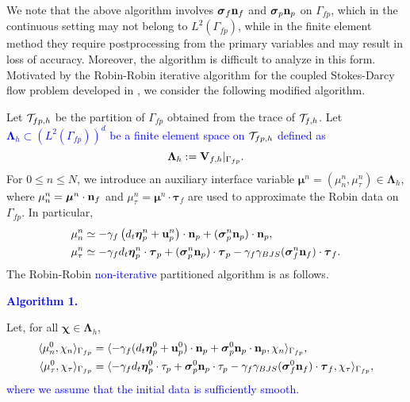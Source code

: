\documentclass[11pt]{article}
\def\u{{\bf u}}
\def\n{{\bf n}}
\def\btau{\boldsymbol{\tau}}
\def\bbeta{\boldsymbol{\eta}}
\def\bs{\boldsymbol{\sigma}}
\def\bchi{\boldsymbol{\chi}}
\def\bmu{\boldsymbol{\mu}}
\def\bL{\boldsymbol{\Lambda}}
\def\V{{\bf V}}
\def\T{{\cal T}}
\def\<{\langle}
\def\>{\rangle}
\def\cl {\nonumber \\}
\def\el {\nonumber }
\def\dt{d_t}
\begin{document}
{We note that the above algorithm involves $\bs_f\n_f$ and $\bs_p\n_p$ on $\Gamma_{fp}$, which in the continuous setting may not belong to $L^2(\Gamma_{fp})$, while in the finite element method they require postprocessing from the primary variables and may result in loss of accuracy. Moreover, the algorithm is difficult to analyze in this form. Motivated by the Robin-Robin iterative algorithm for the coupled Stokes-Darcy flow problem developed in \cite{Disc-Quart-Valli-2007}, we consider the following modified algorithm.}

Let $\T_{fp,h}$ be the partition of $\Gamma_{fp}$ obtained from the trace of $\T_{f,h}$.
Let \textcolor{blue}{$\bL_h \subset (L^2(\Gamma_{fp}))^d$ be a finite element space on $\T_{fp,h}$ defined as}
%
\begin{equation}\label{Lambda-h-defn}
  {\bL_{h} := \V_{f,h}|_{\Gamma_{fp}}.}
\end{equation}
%
For $0 \le n \le N$, we introduce an auxiliary interface variable $\bmu^n= (\mu_n^n,\mu_\tau^n) \in \bL_h$, where $\mu_n^n  = \bmu^n\cdot\n_f$ and $\mu_\tau^n = \bmu^n\cdot\btau_f$ are used to approximate the Robin data on $\Gamma_{fp}$. In particular,
%
\begin{subequations}\label{mu-approx}
\begin{align}
& \mu_n^n \simeq -\gamma_f \left(\dt\bbeta_p^n + \u_p^{n}\right)\cdot\n_p
+ (\bs_p^{n} \n_p)\cdot\n_p, \label{mu-n-approx} \\
& \mu_{\tau}^{n} \simeq - \gamma_f \dt\bbeta_p^n\cdot\btau_{p}
+ (\bs_p^{n}\n_p)\cdot\btau_{p} - \gamma_f \gamma_{BJS} (\bs_f^{n}\n_f)\cdot\btau_{f}. \label{mu-t-approx}
\end{align}
\end{subequations}
%
The Robin-Robin \textcolor{blue}{non-iterative} partitioned algorithm is as follows.

\medskip
\noindent
\textcolor{blue}{{\bf Algorithm 1.}}
    
\medskip
Let, for all $\bchi \in \bL_h$,
%
\begin{align*}
    \<\mu_n^0,\chi_n\>_{\Gamma_{fp}} &= \<-\gamma_f(\dt\bbeta_p^0+\u_p^0)\cdot\n_p + \bs_p^0\n_p\cdot\n_p,\chi_n\>_{\Gamma_{fp}}, \cl
    \<\mu_{\tau}^0,\chi_\tau\>_{\Gamma_{fp}}
    &= \<-\gamma_f\dt\bbeta_p^0\cdot\tau_{p}+\bs_p^0\n_p\cdot\tau_{p}  -\gamma_f\gamma_{BJS}(\bs_f^{0}\n_f)\cdot\btau_{f},\chi_\tau\>_{\Gamma_{fp}}, \el
  \end{align*}
%
\textcolor{blue}{where we assume that the initial data is sufficiently smooth.}
\end{document}
